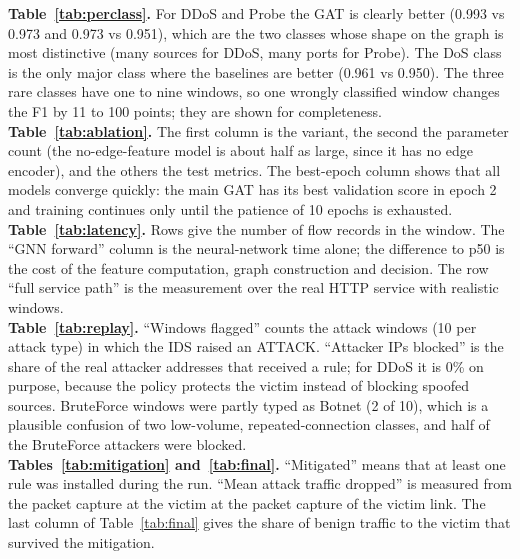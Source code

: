 \textbf{Table~\ref{tab:perclass}.} For DDoS and Probe the GAT is clearly better (0.993 vs 0.973 and 0.973 vs 0.951), which are the two classes whose shape on the graph is most distinctive (many sources for DDoS, many ports for Probe). The DoS class is the only major class where the baselines are better (0.961 vs 0.950). The three rare classes have one to nine windows, so one wrongly classified window changes the F1 by 11 to 100 points; they are shown for completeness.\\

\textbf{Table~\ref{tab:ablation}.} The first column is the variant, the second the parameter count (the no-edge-feature model is about half as large, since it has no edge encoder), and the others the test metrics. The best-epoch column shows that all models converge quickly: the main GAT has its best validation score in epoch 2 and training continues only until the patience of 10 epochs is exhausted.\\

\textbf{Table~\ref{tab:latency}.} Rows give the number of flow records in the window. The ``GNN forward'' column is the neural-network time alone; the difference to p50 is the cost of the feature computation, graph construction and decision. The row ``full service path'' is the measurement over the real HTTP service with realistic windows.\\

\textbf{Table~\ref{tab:replay}.} ``Windows flagged'' counts the attack windows (10 per attack type) in which the IDS raised an ATTACK. ``Attacker IPs blocked'' is the share of the real attacker addresses that received a rule; for DDoS it is 0\% on purpose, because the policy protects the victim instead of blocking spoofed sources. BruteForce windows were partly typed as Botnet (2 of 10), which is a plausible confusion of two low-volume, repeated-connection classes, and half of the BruteForce attackers were blocked.\\

\textbf{Tables~\ref{tab:mitigation} and~\ref{tab:final}.} ``Mitigated'' means that at least one rule was installed during the run. ``Mean attack traffic dropped'' is measured from the packet capture at the victim at the packet capture of the victim link. The last column of Table~\ref{tab:final} gives the share of benign traffic to the victim that survived the mitigation.

